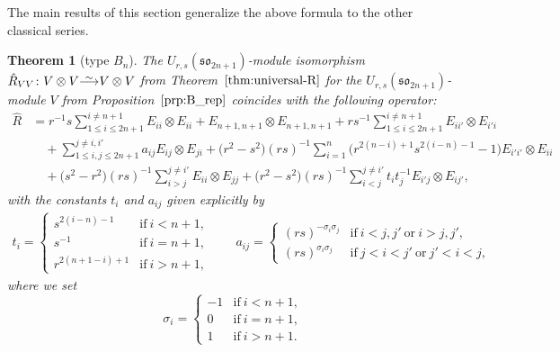 \documentclass[pdftex]{sigma}
\numberwithin{equation}{section}
\newtheorem{Theorem}{Theorem}[section]
\newcommand{\sso}{\mathfrak{so}}
\newcommand\iso{ \vphantom{j^{X^2}}\smash{\overset{\sim}{\vphantom{\rule{0pt}{0.20em}}\smash{\longrightarrow}}} }
\begin{document}
The main results of this section generalize the above formula to the other classical series.

\begin{Theorem}[type $B_{n}$]\label{thm:B_RMatrix}
The $U_{r,s}(\sso_{2n+1})$-module isomorphism $\hat{R}_{VV}\colon V \otimes V \iso V \otimes V$ from Theorem~$\ref{thm:universal-R}$ for the $U_{r,s}(\sso_{2n+1})$-module $V$ from Proposition~$\ref{prp:B_rep}$ coincides with the following operator:
\begin{align}
 \hat{R} &{}=
 r^{-1}s \sum_{1\leq i\leq 2n+1}^{i\ne n+1} E_{ii} \otimes E_{ii} +
 E_{n + 1,n + 1} \otimes E_{n + 1,n+1} +
 rs^{-1} \sum_{1\leq i\leq 2n+1}^{i\ne n+1} E_{ii'} \otimes E_{i'i} \nonumber\\
 &\quad{}+ \sum_{1\leq i,j\leq 2n+1}^{j\ne i,i'} a_{ij}E_{ij} \otimes E_{ji} +
 \bigl(r^{2} - s^{2}\bigr)(rs)^{-1} \sum_{i = 1}^{n}\bigl(r^{2(n-i)+1}s^{2(i-n)-1}-1\bigr) E_{i'i'} \otimes E_{ii}\nonumber \\
 &\quad{}+ \bigl(s^{2} - r^{2}\bigr)(rs)^{-1} \sum_{i > j}^{j \neq i'} E_{ii} \otimes E_{jj} +
 \bigl(r^{2} - s^{2}\bigr)(rs)^{-1} \sum_{i < j}^{j \neq i'} t_{i}t_{j}^{-1}E_{i'j} \otimes E_{ij'},\label{eq:B_RMatrix}
\end{align}
with the constants $t_i$ and $a_{ij}$ given explicitly by
\begin{gather}\label{eq:B_coeffs}
 t_{i} =
 \begin{cases}
 s^{2(i - n) - 1} & \text{if}\ i < n + 1, \\
 s^{-1} & \text{if}\ i = n + 1, \\
 r^{2(n +1 - i) + 1} & \text{if}\ i > n + 1,
 \end{cases}\qquad
 a_{ij} =
 \begin{cases}
 (rs)^{-\sigma_{i}\sigma_{j}} & \text{if}\ i < j,j'\ \text{or}\ i > j,j', \\
 (rs)^{\sigma_{i}\sigma_{j}} & \text{if}\ j < i < j'\ \text{or}\ j' < i < j,
 \end{cases}
\end{gather}
where we set
\[
 \sigma_{i} =
 \begin{cases}
 -1 & \text{if}\ i < n + 1, \\
 0 & \text{if}\ i = n+ 1, \\
 1 & \text{if}\ i > n + 1.
 \end{cases}
\]
\end{Theorem}
\end{document}
